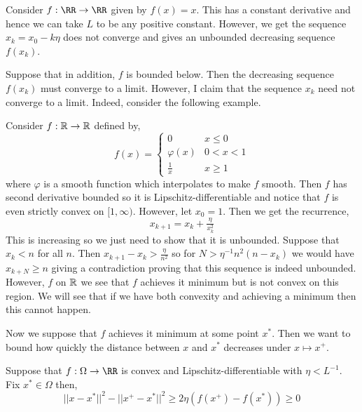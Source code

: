 \documentclass[12pt]{article}
\begin{document}
\begin{rmk}
Consider $f : \RR \to \RR$ given by $f(x) = x$. This has a constant derivative and hence we can take $L$ to be any positive constant. However, we get the sequence $x_k = x_0 - k \eta$ does not converge and gives an unbounded decreasing sequence $f(x_k)$. 
\end{rmk}

\begin{cor}
Suppose that in addition, $f$ is bounded below. Then the decreasing sequence $f(x_k)$ must converge to a limit. However, I claim that the sequence $x_k$ need not converge to a limit. Indeed, consider the following example.
\end{cor}

\begin{example}
Consider $f : \mathbb{R} \to \mathbb{R}$ defined by,
\[ f(x) =
\begin{cases}
0 & x \le 0
\\
\varphi(x)  & 0 < x < 1
\\
\frac{1}{x} & x \ge 1
\end{cases} \]
where $\varphi$ is a smooth function which interpolates to make $f$ smooth. 
Then $f$ has second derivative bounded so it is Lipschitz-differentiable and notice that $f$ is even strictly convex on $[1, \infty)$. However, let $x_0 = 1$. Then we get the recurrence,
\[ x_{k+1} = x_k + \tfrac{\eta}{x_k^2} \]
This is increasing so we just need to show that it is unbounded. Suppose that $x_k < n$ for all $n$. Then $x_{k+1} - x_k > \tfrac{\eta}{n^2}$ so for $N > \eta^{-1} n^2 (n - x_k)$ we would have $x_{k+N} \ge n$ giving a contradiction proving that this sequence is indeed unbounded. However, $f$ on $\mathbb{R}$ we see that $f$ achieves it minimum but is not convex on this region. We will see that if we have both convexity and achieving a minimum then this cannot happen.
\end{example}

\begin{rmk}
Now we suppose that $f$ achieves it minimum at some point $x^*$. Then we want to bound how quickly the distance between $x$ and $x^*$ decreases under $x \mapsto x^+$.
\end{rmk}

\begin{prop}
Suppose that $f : \Omega \to \RR$ is convex and Lipschitz-differentiable with $\eta < L^{-1}$. Fix $x^* \in \Omega$ then,
\[ || x - x^* ||^2 - || x^+ - x^* ||^2 \ge 2 \eta (f(x^+) - f(x^*)) \ge 0 \]
\end{prop}
\end{document}
